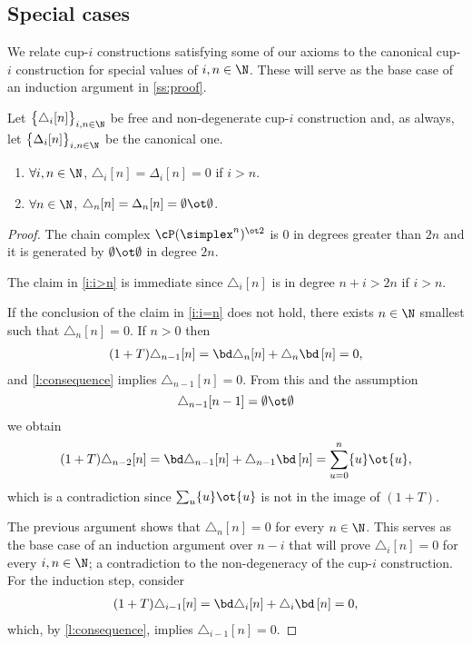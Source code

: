 \subsection{Special cases}\label{ss:cases}

We relate cup-$i$ constructions satisfying some of our axioms to the canonical cup-$i$ construction for special values of $i,n \in \N$.
These will serve as the base case of an induction argument in \cref{ss:proof}.

\begin{lemma}\label{l:special case one}
	Let $\big\{ \triangle_i [n] \big\}_{i,n\in\N}$ be free and non-degenerate \mbox{cup-$i$} construction and, as always, let $\big\{ \Delta_i [n] \big\}_{i,n\in\N}$ be the canonical one.
	\begin{enumerate}
		\item \label{i:i>n} $\forall i,n \in \N$, $\triangle_i[n] = \Delta_i [n] = 0$ if $i > n$.
		\item \label{i:i=n} $\forall n \in \N$, $\triangle_n[n] = \Delta_n [n] = \emptyset \ot \emptyset$.
	\end{enumerate}
\end{lemma}

\begin{proof}
	The chain complex $\cP(\simplex^n)^{\ot 2}$ is $0$ in degrees greater than $2n$ and it is generated by $\emptyset \ot \emptyset$ in degree $2n$.

	The claim in \cref{i:i>n} is immediate since $\triangle_i[n]$ is in degree $n+i > 2n$ if $i > n$.

	If the conclusion of the claim in \cref{i:i=n} does not hold, there exists $n \in \N$ smallest such that $\triangle_n [n] = 0$.
	If $n > 0$ then
	\begin{align*}
	(1+T) \triangle_{n-1} [n] =
	\bd \triangle_{n} [n] + \triangle_{n} \bd \, [n] = 0,
	\end{align*}
	and \cref{l:consequence} implies $\triangle_{n-1} [n] = 0$.
	From this and the assumption
	\[
	\triangle_{n-1}[n-1] = \emptyset \ot \emptyset
	\]
	we obtain
	\begin{equation}
	\begin{split}
	(1+T)\triangle_{n-2} [n] =
	\bd \triangle_{n-1} [n] + \triangle_{n-1} \bd \, [n] =
	\sum_{u = 0}^n \{u\} \ot \{u\},
	\end{split}
	\end{equation}
	which is a contradiction since $\sum_u \{u\} \ot \{u\}$ is not in the image of $(1+T)$.

	The previous argument shows that $\triangle_n [n] = 0$ for every $n \in \N$.
	This serves as the base case of an induction argument over $n-i$ that will prove $\triangle_i [n] = 0$ for every $i, n \in \N$; a contradiction to the non-degeneracy of the cup-$i$ construction.
	For the induction step, consider
	\begin{align*}
	(1+T) \triangle_{i-1} [n] =
	\bd \triangle_{i} [n] + \triangle_{i} \bd\, [n] = 0,
	\end{align*}
	which, by \cref{l:consequence}, implies $\triangle_{i-1} [n] = 0$.
\end{proof}

